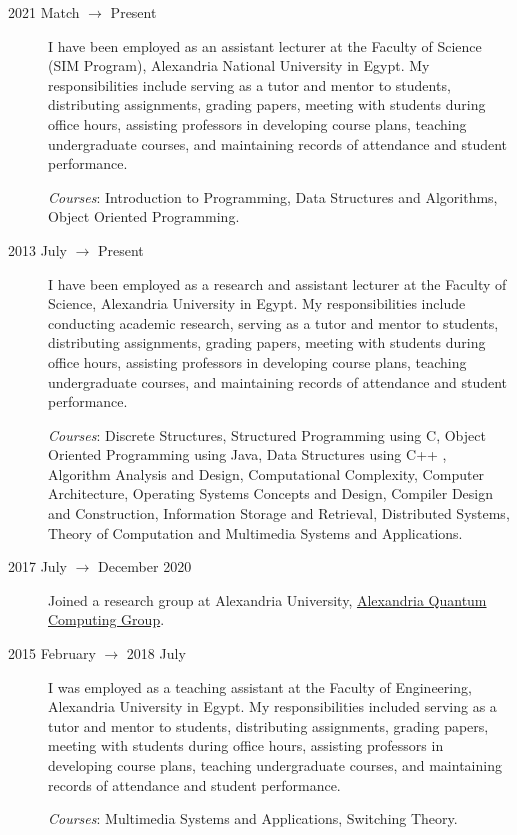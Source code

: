 \documentclass[margin,line]{resume}
\begin{document}
\begin{resume}
\begin{description}
		\item[2021 Match $\rightarrow$ Present] I have been employed as an assistant lecturer at the Faculty of Science (SIM Program), Alexandria National University in Egypt. My responsibilities include serving as a tutor and mentor to students, distributing assignments, grading papers, meeting with students during office hours, assisting professors in developing course plans, teaching undergraduate courses, and maintaining records of attendance and student performance.

			\emph{Courses}: Introduction to Programming, Data Structures and Algorithms, Object Oriented Programming.

		\item[2013 July $\rightarrow$ Present]  I have been employed as a research and assistant lecturer at the Faculty of Science, Alexandria University in Egypt. My responsibilities include conducting academic research, serving as a tutor and mentor to students, distributing assignments, grading papers, meeting with students during office hours, assisting professors in developing course plans, teaching undergraduate courses, and maintaining records of attendance and student performance.

			\emph{Courses}: Discrete Structures, Structured Programming using C, Object Oriented Programming using Java, Data Structures using C++ , Algorithm Analysis and Design, Computational Complexity, Computer Architecture, Operating Systems Concepts and Design, Compiler Design and Construction, Information Storage and Retrieval, Distributed Systems, Theory of Computation and Multimedia Systems and Applications.


		\item[2017 July $\rightarrow$ December 2020 ]  Joined a research group at Alexandria University, \href{http://www.sci.p.alexu.edu.eg/~aleqcg/index.html}{Alexandria Quantum Computing Group}.




		\item[2015 February $\rightarrow$ 2018 July]  I was employed as a teaching assistant at the Faculty of Engineering, Alexandria University in Egypt. My responsibilities included serving as a tutor and mentor to students, distributing assignments, grading papers, meeting with students during office hours, assisting professors in developing course plans, teaching undergraduate courses, and maintaining records of attendance and student performance.

			\emph{Courses}: Multimedia Systems and Applications, Switching Theory.


\end{description}
\end{resume}
\end{document}
